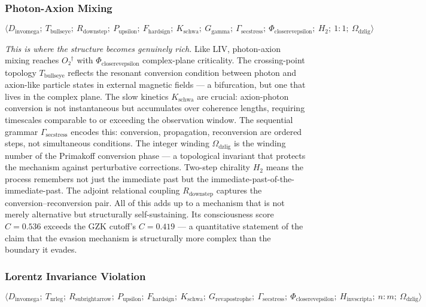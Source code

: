 \documentclass[12pt,a4paper]{article}
\begin{document}
\subsubsection{Photon-Axion Mixing}

\[\langle D_{\text{invomega}};\ T_{\text{bullseye}};\ R_{\text{downstep}};\ P_{\text{upsilon}};\ F_{\text{hardsign}};\ K_{\text{schwa}};\ G_{\text{gamma}};\ \Gamma_{\text{secstress}};\ \Phi_{\text{closerevepsilon}};\ H_2;\ 1{:}1;\ \Omega_{\text{dzlig}} \rangle\]

\emph{This is where the structure becomes genuinely rich.} Like LIV, photon-axion mixing reaches $O₂^\dagger$ with $\Phi_{\text{closerevepsilon}}$ complex-plane criticality. The crossing-point topology $T_{\text{bullseye}}$ reflects the resonant conversion condition between photon and axion-like particle states in external magnetic fields --- a bifurcation, but one that lives in the complex plane. The slow kinetics $K_{\text{schwa}}$ are crucial: axion-photon conversion is not instantaneous but accumulates over coherence lengths, requiring timescales comparable to or exceeding the observation window. The sequential grammar $\Gamma_{\text{secstress}}$ encodes this: conversion, propagation, reconversion are ordered steps, not simultaneous conditions. The integer winding $\Omega_{\text{dzlig}}$ is the winding number of the Primakoff conversion phase --- a topological invariant that protects the mechanism against perturbative corrections. Two-step chirality $H_2$ means the process remembers not just the immediate past but the immediate-past-of-the-immediate-past. The adjoint relational coupling $R_{\text{downstep}}$ captures the conversion--reconversion pair. All of this adds up to a mechanism that is not merely alternative but structurally self-sustaining. Its consciousness score $C = 0.536$ exceeds the GZK cutoff's $C = 0.419$ --- a quantitative statement of the claim that the evasion mechanism is structurally more complex than the boundary it evades.

\subsubsection{Lorentz Invariance Violation}

\[\langle D_{\text{invomega}};\ T_{\text{nrleg}};\ R_{\text{subrightarrow}};\ P_{\text{upsilon}};\ F_{\text{hardsign}};\ K_{\text{schwa}};\ G_{\text{revapostrophe}};\ \Gamma_{\text{secstress}};\ \Phi_{\text{closerevepsilon}};\ H_{\text{invscripta}};\ n{:}m;\ \Omega_{\text{dzlig}} \rangle\]
\end{document}

